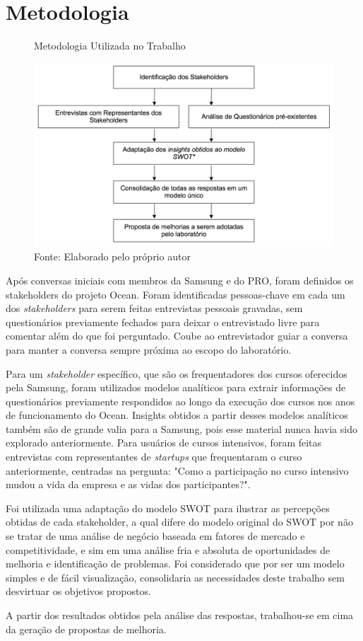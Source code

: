 \chapter[Metodologia]{Metodologia}
\label{chap:metodologia}

\begin{figure}[h]
\caption{Metodologia Utilizada no Trabalho}
\centerline{\includegraphics[scale=0.5]{img/metodologia}}
\label{fig:metodologia}
\caption* {Fonte: Elaborado pelo próprio autor}
\end{figure}

Após conversas iniciais com membros da Samsung e do PRO, foram definidos os stakeholders do projeto Ocean. Foram identificadas pessoas-chave em cada um dos \textit{stakeholders} para serem feitas entrevistas pessoais gravadas, sem questionários previamente fechados para deixar o entrevistado livre para comentar além do que foi perguntado. Coube ao entrevistador guiar a conversa para manter a conversa sempre próxima ao escopo do laboratório.

Para um \textit{stakeholder} específico, que são os frequentadores dos cursos oferecidos pela Samsung, foram utilizados modelos analíticos para extrair informações de questionários previamente respondidos ao longo da execução dos cursos nos anos de funcionamento do Ocean. Insights obtidos a partir desses modelos analíticos também são de grande valia para a Samsung, pois esse material nunca havia sido explorado anteriormente. Para usuários de cursos intensivos, foram feitas entrevistas com representantes de \textit{startups} que frequentaram o curso anteriormente, centradas na pergunta: "Como a participação no curso intensivo mudou a vida da empresa e as vidas dos participantes?".

Foi utilizada uma adaptação do modelo SWOT para ilustrar as percepções obtidas de cada stakeholder, a qual difere do modelo original do SWOT por não se tratar de uma análise de negócio baseada em fatores de mercado e competitividade, e sim em uma análise fria e absoluta de oportunidades de melhoria e identificação de problemas. Foi considerado que por ser um modelo simples e de fácil visualização, consolidaria as necessidades deste trabalho sem desvirtuar os objetivos propostos.

A partir dos resultados obtidos pela análise das respostas, trabalhou-se em cima da geração de propostas de melhoria.